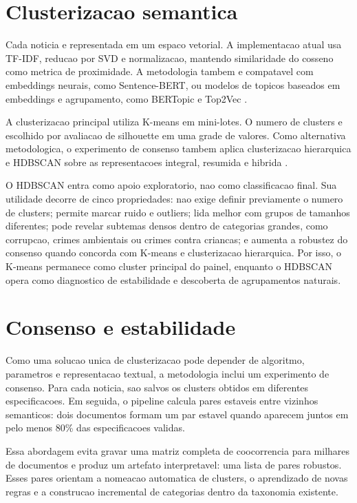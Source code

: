 \documentclass[12pt]{article}
\begin{document}
\section{Clusterizacao semantica}

Cada noticia e representada em um espaco vetorial. A implementacao atual usa TF-IDF, reducao por SVD e normalizacao, mantendo similaridade do cosseno como metrica de proximidade. A metodologia tambem e compatavel com embeddings neurais, como Sentence-BERT, ou modelos de topicos baseados em embeddings e agrupamento, como BERTopic e Top2Vec \citep{reimers2019sentencebert,grootendorst2022bertopic,angelov2020top2vec}.

A clusterizacao principal utiliza K-means em mini-lotes. O numero de clusters e escolhido por avaliacao de silhouette em uma grade de valores. Como alternativa metodologica, o experimento de consenso tambem aplica clusterizacao hierarquica e HDBSCAN sobre as representacoes integral, resumida e hibrida \citep{campello2013hdbscan}.

O HDBSCAN entra como apoio exploratorio, nao como classificacao final. Sua utilidade decorre de cinco propriedades: nao exige definir previamente o numero de clusters; permite marcar ruido e outliers; lida melhor com grupos de tamanhos diferentes; pode revelar subtemas densos dentro de categorias grandes, como corrupcao, crimes ambientais ou crimes contra criancas; e aumenta a robustez do consenso quando concorda com K-means e clusterizacao hierarquica. Por isso, o K-means permanece como cluster principal do painel, enquanto o HDBSCAN opera como diagnostico de estabilidade e descoberta de agrupamentos naturais.

\section{Consenso e estabilidade}

Como uma solucao unica de clusterizacao pode depender de algoritmo, parametros e representacao textual, a metodologia inclui um experimento de consenso. Para cada noticia, sao salvos os clusters obtidos em diferentes especificacoes. Em seguida, o pipeline calcula pares estaveis entre vizinhos semanticos: dois documentos formam um par estavel quando aparecem juntos em pelo menos 80\% das especificacoes validas.

Essa abordagem evita gravar uma matriz completa de coocorrencia para milhares de documentos e produz um artefato interpretavel: uma lista de pares robustos. Esses pares orientam a nomeacao automatica de clusters, o aprendizado de novas regras e a construcao incremental de categorias dentro da taxonomia existente.
\end{document}
